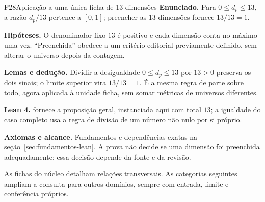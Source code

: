 \begin{formalizacao}{F28}{Aplicação a uma única ficha de 13 dimensões}
\textbf{Enunciado.} Para $0\leq d_p\leq13$, a razão $d_p/13$ pertence a
$[0,1]$; preencher as 13 dimensões fornece $13/13=1$.

\textbf{Hipóteses.} O denominador fixo $13$ é positivo e cada dimensão
conta no máximo uma vez. ``Preenchida'' obedece a um critério editorial
previamente definido, sem alterar o universo depois da contagem.

\textbf{Lemas e dedução.} Dividir a desigualdade
$0\leq d_p\leq13$ por $13>0$ preserva os dois sinais; o limite superior
vira $13/13=1$. É a mesma regra de parte sobre todo, agora aplicada à
unidade ficha, sem somar métricas de universos diferentes.

\textbf{Lean 4.} 
fornece a proposição geral, instanciada aqui com total $13$; a igualdade
do caso completo usa a regra de divisão de um número não nulo por si próprio.

\textbf{Axiomas e alcance.} Fundamentos e dependências exatas na
seção~\ref{sec:fundamentos-lean}. A prova não decide se uma dimensão foi
preenchida adequadamente; essa decisão depende da fonte e da revisão.
\end{formalizacao}

As fichas do núcleo detalham relações transversais. As categorias seguintes ampliam a consulta para outros domínios, sempre com entrada, limite e conferência próprios.
